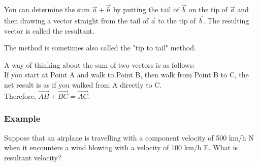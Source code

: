 \documentclass{article}
\begin{document}
You can determine the sum $\vec{a}+\vec{b}$ by putting the tail of $\vec{b}$ on the tip of $\vec{a}$ and then drawing a vector straight from the tail of $\vec{a}$ to the tip of $\vec{b}$. The resulting vector is called the resultant.

The method is sometimes also called the "tip to tail" method.
\begin{center}
\end{center}

A way of thinking about the sum of two vectors is as follows:\\

If you start at Point A and walk to Point B, then walk from Point B to C, the net result is as if you walked from A directly to C.\\

Therefore, $\overrightarrow{AB}+\overrightarrow{BC}=\overrightarrow{AC}$.

\subsubsection*{Example}
Suppose that an airplane is travelling with a component velocity of 500 km/h N when it encounters a wind blowing with a velocity of 100 km/h E. What is resultant velocity?
\end{document}

